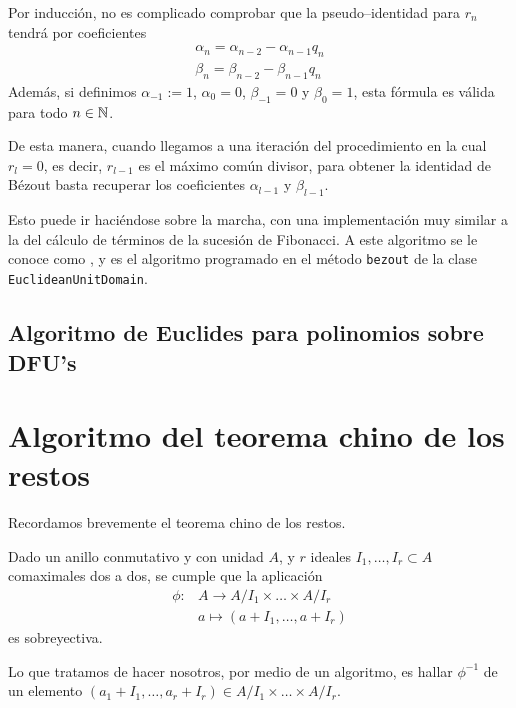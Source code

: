 \documentclass[a4paper, 11pt, twoside, notitlepage, openany, onecolumn, final]{report}
\begin{document}
	Por inducción, no es complicado comprobar que la pseudo--identidad para $r_n$ tendrá por coeficientes
	\begin{equation*}
		\begin{array}{c}
			\alpha_n=\alpha_{n-2}-\alpha_{n-1}q_n\\
			\beta_n=\beta_{n-2}-\beta_{n-1}q_n
		\end{array}
	\end{equation*}
	Además, si definimos $\alpha_{-1}:=1$, $\alpha_{0}=0$, $\beta_{-1}=0$ y $\beta_{0}=1$, esta fórmula es válida para todo $n\in\mathbb{N}$.
	
	De esta manera, cuando llegamos a una iteración del procedimiento en la cual $r_l=0$, es decir, $r_{l-1}$ es el máximo común divisor, para obtener la identidad de Bézout basta recuperar los coeficientes $\alpha_{l-1}$ y $\beta_{l-1}$.
	
	Esto puede ir haciéndose sobre la marcha, con una implementación muy similar a la del cálculo de términos de la sucesión de Fibonacci. A este algoritmo se le conoce como , y es el algoritmo programado en el método \texttt{bezout} de la clase \texttt{EuclideanUnitDomain}.
	\subsection{Algoritmo de Euclides para polinomios sobre DFU's}
	\section{Algoritmo del teorema chino de los restos}
	Recordamos brevemente el teorema chino de los restos.
	\begin{theo}
		Dado un anillo conmutativo y con unidad $A$, y $r$ ideales $I_1,\dots,I_r\subset A$ comaximales dos a dos, se cumple que la aplicación
		\begin{equation*}
			\begin{array}{cc}
			\phi:&A\to A/I_1\times\dots\times A/I_r\\
			& a\mapsto (a+I_1,\dots,a+I_r)
			\end{array}
		\end{equation*}
		es sobreyectiva.
	\end{theo}
	Lo que tratamos de hacer nosotros, por medio de un algoritmo, es hallar $\phi^{-1}$ de un elemento $(a_1+I_1,\dots,a_r+I_r)\in A/I_1\times\dots\times A/I_r$.
\end{document}
